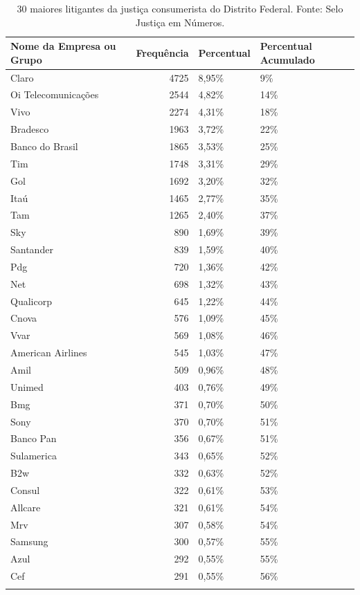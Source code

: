 \documentclass[]{report}
\begin{document}
\begin{longtable}{lrll}
\caption{30 maiores litigantes da justiça consumerista do Distrito Federal. Fonte: Selo Justiça em Números.} \\
  \hline
Nome da Empresa ou Grupo & Frequência & Percentual & Percentual Acumulado \\
  \hline
Claro & 4725 & 8,95\% & 9\% \\
  Oi
Telecomunicações & 2544 & 4,82\% & 14\% \\
  Vivo & 2274 & 4,31\% & 18\% \\
  Bradesco & 1963 & 3,72\% & 22\% \\
  Banco do Brasil & 1865 & 3,53\% & 25\% \\
  Tim & 1748 & 3,31\% & 29\% \\
  Gol & 1692 & 3,20\% & 32\% \\
  Itaú & 1465 & 2,77\% & 35\% \\
  Tam & 1265 & 2,40\% & 37\% \\
  Sky & 890 & 1,69\% & 39\% \\
  Santander & 839 & 1,59\% & 40\% \\
  Pdg & 720 & 1,36\% & 42\% \\
  Net & 698 & 1,32\% & 43\% \\
  Qualicorp & 645 & 1,22\% & 44\% \\
  Cnova & 576 & 1,09\% & 45\% \\
  Vvar & 569 & 1,08\% & 46\% \\
  American
Airlines & 545 & 1,03\% & 47\% \\
  Amil & 509 & 0,96\% & 48\% \\
  Unimed & 403 & 0,76\% & 49\% \\
  Bmg & 371 & 0,70\% & 50\% \\
  Sony & 370 & 0,70\% & 51\% \\
  Banco Pan & 356 & 0,67\% & 51\% \\
  Sulamerica & 343 & 0,65\% & 52\% \\
  B2w & 332 & 0,63\% & 52\% \\
  Consul & 322 & 0,61\% & 53\% \\
  Allcare & 321 & 0,61\% & 54\% \\
  Mrv & 307 & 0,58\% & 54\% \\
  Samsung & 300 & 0,57\% & 55\% \\
  Azul & 292 & 0,55\% & 55\% \\
  Cef & 291 & 0,55\% & 56\% \\
   \hline
\hline
\label{unnamed-chunk-55}
\end{longtable}
\end{document}
